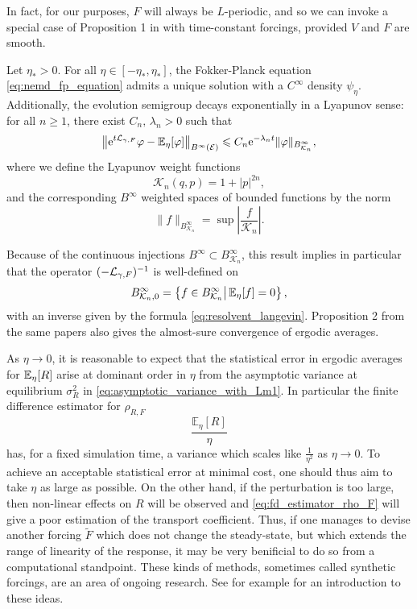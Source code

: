 In fact, for our purposes, $F$ will always be $L$-periodic, and so we can invoke a special case of Proposition 1 in \cite{JPS15} with time-constant forcings, provided $V$ and $F$ are smooth.
\begin{theorem}\label{thm:nemd_exst_invariant_measure}
    Let $\eta_*>0$. For all $\eta\in[-\eta_*,\eta_*]$, the Fokker-Planck equation \eqref{eq:nemd_fp_equation} admits a unique solution with a $C^\infty$ density $\psi_\eta$.
    Additionally, the evolution semigroup decays exponentially in a Lyapunov sense: for all $n\geq 1$, there exist $C_n,\,\lambda_n>0$ such that
    \begin{equation}
        \label{eq:lyapunov_exp_decay}
        \left\|\mathrm{e}^{t\mathcal{L}_{\gamma,F}}\varphi-\mathbb{E}_\eta[\varphi]\right\|_{B^{\infty}(\mathcal E)}\leqslant C_n\mathrm{e}^{-\lambda_n t}\|\varphi\|_{B^\infty_{\mathcal K_n}},
    \end{equation}
    where we define the Lyapunov weight functions
    \[\mathcal K_n(q,p)=1+|p|^{2n},\]
    and the corresponding $B^{\infty}$ weighted spaces of bounded functions by the norm
    \[\|f\|_{B^\infty_{\mathcal K_n}}=\sup \left|\frac{f}{\mathcal K_n}\right|.\]
\end{theorem}
Because of the continuous injections $B^\infty \subset B^\infty_{\mathcal K_n}$, this result implies in particular that the operator 
$(-\mathcal{L}_{\gamma,F})^{-1}$ is well-defined on 
\[B^\infty_{\mathcal K_n,0}=\left\{f\in B^\infty_{\mathcal K_n}\middle|\,\mathbb{E}_\eta[f]=0\right\},\]
with an inverse given by the formula \eqref{eq:resolvent_langevin}. Proposition 2 from the same papers also gives the almost-sure convergence of ergodic averages.
 \begin{remark}\label{rem:linear_regime}
    As $\eta \to 0$, it is reasonable to expect that the statistical error in ergodic averages for
    $\mathbb{E}_\eta[R]$ arise at dominant order in $\eta$ from the asymptotic variance at equilibrium $\sigma^2_R$ in \eqref{eq:asymptotic_variance_with_Lm1}.
    In particular the finite difference estimator for $\rho_{R,F}$
    \begin{equation}
        \label{eq:fd_estimator_rho_F}
        \frac{\mathbb{E}_\eta[R]}{\eta}
    \end{equation}
    has, for a fixed simulation time, a variance which scales like $\frac1{\eta^2}$ as $\eta\to 0$.
    To achieve an acceptable statistical error at minimal cost, one should thus aim to take $\eta$ as large as possible.
    On the other hand, if the perturbation is too large, then non-linear effects on $R$ will be observed and \eqref{eq:fd_estimator_rho_F} 
    will give a poor estimation of the transport coefficient.
    Thus, if one manages to devise another forcing $\tilde F$ which does not change the steady-state, but which extends the range of linearity of the response,
    it may be very benificial to do so from a computational standpoint. These kinds of methods, sometimes called synthetic forcings, are an area of ongoing research. See for example \cite[Section 6.1]{EM08} for an introduction to these ideas.
 \end{remark}
